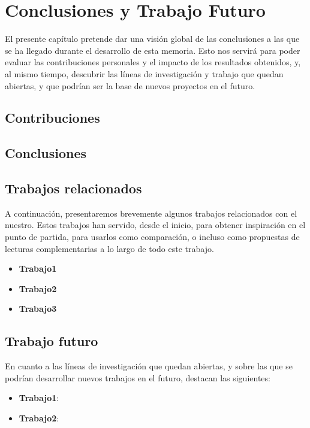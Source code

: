 \chapter{Conclusiones y Trabajo Futuro} \label{Capitulo 5}
El presente capítulo pretende dar una visión global de las conclusiones a las que se ha llegado durante el desarrollo de esta memoria. Esto nos servirá para poder evaluar las contribuciones personales y el impacto de los resultados obtenidos, y, al mismo tiempo, descubrir las líneas de investigación y trabajo que quedan abiertas, y que podrían ser la base de nuevos proyectos en el futuro.
\section{Contribuciones}


\section{Conclusiones}



\section{Trabajos relacionados}

A continuación, presentaremos brevemente algunos trabajos relacionados con el nuestro. Estos trabajos han servido, desde el inicio, para obtener inspiración en el punto de partida, para usarlos como comparación, o incluso como propuestas de lecturas complementarias a lo largo de todo este trabajo. 

\begin{itemize}

\item \textbf{Trabajo1} 

\item \textbf{Trabajo2} 

\item \textbf{Trabajo3} 

\end{itemize}

\section{Trabajo futuro}
\label{sec:trabajofuturo}
En cuanto a las líneas de investigación que quedan abiertas, y sobre las que se podrían desarrollar nuevos trabajos en el futuro, destacan las siguientes:

\begin{itemize}

    \item \textbf{Trabajo1}: 
    \item \textbf{Trabajo2}: 

\end{itemize}
